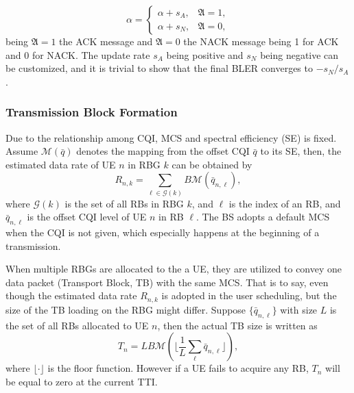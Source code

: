 \documentclass[conference,compsocconf]{IEEEtran}
\begin{document}
\begin{equation}
\alpha=
\begin{cases}
\alpha+s_A, & \mathfrak{A} = 1, \\
\alpha+s_N, & \mathfrak{A} = 0,
\end{cases}
\end{equation}
being $\mathfrak{A}=1$ the ACK message and $\mathfrak{A}=0$ the NACK message being 1 for ACK and 0 for NACK. The update rate $s_A$ being positive and $s_N$ being negative can be customized, and it is trivial to show that the final BLER converges to $-s_N/s_A$.

\subsubsection{Transmission Block Formation}
Due to the relationship among CQI, MCS and spectral efficiency (SE) is fixed. Assume $\mathcal{M}(\bar{q})$ denotes the mapping from the offset CQI $\bar{q}$ to its SE, then, the estimated data rate of UE $n$ in RBG $k$ can be obtained by
\begin{equation}
R_{n,k}=\sum_{\ell\in \mathcal{G}(k)} B\mathcal{M}(\bar{q}_{n,\ell}),
\end{equation}
where $\mathcal{G}(k)$ is the set of all RBs in RBG $k$, and $\ell$ is the index of an RB, and $\bar{q}_{n,\ell}$ is the offset CQI level of UE $n$ in RB $\ell$. The BS adopts a default MCS when the CQI is not given, which especially happens at the beginning of a transmission. 

When multiple RBGs are allocated to the a UE, they are utilized to convey one data packet (Transport Block, TB) with the same MCS. That is to say, even though the estimated data rate $R_{n,k}$ is adopted in the user scheduling, but the size of the TB loading on the RBG might differ. Suppose $\{\bar{q}_{n,\ell}\}$ with size $L$ is the set of all RBs allocated to UE $n$, then the actual TB size is written as
\begin{equation}
T_n=LB\mathcal{M}\left(\bigg\lfloor\frac{1}{L}\sum_{\ell}\bar{q}_{n,\ell}\bigg\rfloor\right),
\end{equation}
where $\lfloor\cdot\rfloor$ is the floor function. However if a UE fails to acquire any RB, $T_n$ will be equal to zero at the current TTI.

\end{document}
